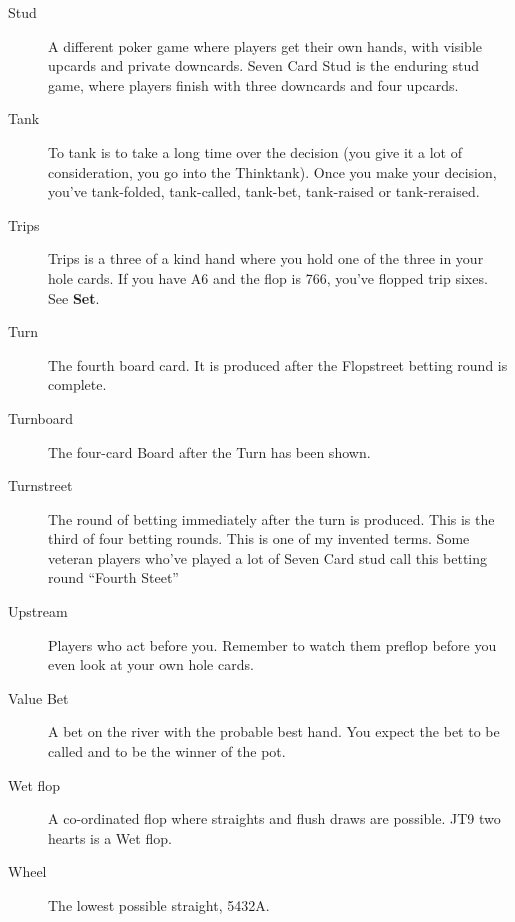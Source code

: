 \begin{description}
\item[Stud] A different poker game where players get their own hands,
with visible upcards and private downcards. Seven Card Stud is the
enduring stud game, where players finish with three downcards and four
upcards.

\item[Tank] To tank is to take a long time over the decision
(you give it a lot of consideration, you go into the Thinktank).
Once you make your decision, you've tank-folded, tank-called, tank-bet,
tank-raised or tank-reraised.

\item[Trips] Trips is a three of a kind hand where you hold one of the
three in your hole cards. If you have A6 and the flop is 766, you've
flopped trip sixes. See \textbf{Set}.

\item[Turn] The fourth board card. It is produced after the Flopstreet
betting round is complete.

\item[Turnboard] The four-card Board after the Turn has been shown.

\item[Turnstreet] The round of betting immediately after the turn is
produced. This is the third of four betting rounds. This is one
of my invented terms. Some veteran players who've played a lot of
Seven Card stud call this betting round ``Fourth Steet''

\item[Upstream] Players who act before you. Remember to watch them
preflop before you even look at your own hole cards.

\item[Value Bet] A bet on the river with the probable best hand. You
expect the bet to be called and to be the winner of the pot.

\item[Wet flop] A co-ordinated flop where straights and flush draws
are possible. JT9 two hearts is a Wet flop.

\item[Wheel] The lowest possible straight, 5432A.

\end{description}
